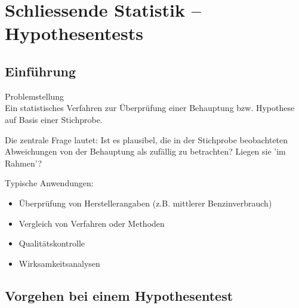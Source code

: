 \section{Schliessende Statistik -- Hypothesentests}

\subsection{Einführung}

\begin{concept}{Problemstellung}\\
Ein statistisches Verfahren zur Überprüfung einer Behauptung bzw. Hypothese auf Basis einer Stichprobe.

Die zentrale Frage lautet: Ist es plausibel, die in der Stichprobe beobachteten Abweichungen von der Behauptung als zufällig zu betrachten? Liegen sie 'im Rahmen'?

Typische Anwendungen:
\begin{itemize}
  \item Überprüfung von Herstellerangaben (z.B. mittlerer Benzinverbrauch)
  \item Vergleich von Verfahren oder Methoden
  \item Qualitätskontrolle
  \item Wirksamkeitsanalysen
\end{itemize}
\end{concept}

\subsection{Vorgehen bei einem Hypothesentest}

